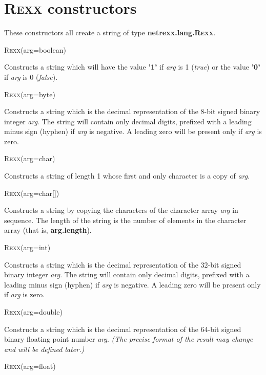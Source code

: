 \section{R\textsc{exx} constructors}\label{refrexxcon}
 These constructors all create a string of type \textbf{netrexx.lang.R\textsc{exx}}.
\begin{description}
\item{R\textsc{exx}(arg=boolean)}

Constructs a string which will have
the value \textbf{'1'} if \emph{arg} is 1 (\emph{true})
or the value \textbf{'0'} if \emph{arg} is 0 (\emph{false}).
\item{R\textsc{exx}(arg=byte)}

Constructs a string which is the decimal representation of
the 8-bit signed binary integer \emph{arg}.
The string will contain only decimal digits, prefixed with a
leading minus sign (hyphen) if \emph{arg} is negative.
A leading zero will be present only if \emph{arg} is zero.
\item{R\textsc{exx}(arg=char)}

Constructs a string of length 1 whose first and only character is a
copy of \emph{arg}.
\item{R\textsc{exx}(arg=char[])}

Constructs a string by copying the characters of the character array
\emph{arg} in sequence.
The length of the string is the number of elements in the character
array (that is, \textbf{arg.length}).
\item{R\textsc{exx}(arg=int)}

Constructs a string which is the decimal representation of
the 32-bit signed binary integer \emph{arg}.
The string will contain only decimal digits, prefixed with a
leading minus sign (hyphen) if \emph{arg} is negative.
A leading zero will be present only if \emph{arg} is zero.
\item{R\textsc{exx}(arg=double)}

Constructs a string which is the decimal representation of
the 64-bit signed binary floating point number \emph{arg}.
 \emph{(The precise format of the result may change and
will be defined later.)}
\item{R\textsc{exx}(arg=float)}


\end{description}
